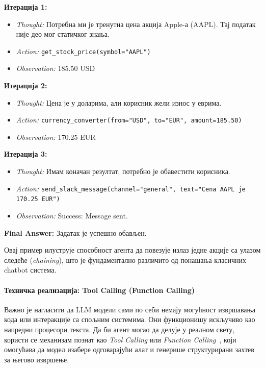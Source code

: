 \begin{tcolorbox}[colback=white,colframe=black,title=Унутрашњи процес агента]
\textbf{Итерација 1:}
\begin{itemize}
    \item \textit{Thought:} Потребна ми је тренутна цена акција Apple-а (AAPL).
    Тај податак није део мог статичког знања.
    \item \textit{Action:} \texttt{get\_stock\_price(symbol="AAPL")}
    \item \textit{Observation:} 185.50 USD
\end{itemize}

\textbf{Итерација 2:}
\begin{itemize}
    \item \textit{Thought:} Цена је у доларима, али корисник жели износ у еврима.
    \item \textit{Action:} \texttt{currency\_converter(from="USD", to="EUR", amount=185.50)}
    \item \textit{Observation:} 170.25 EUR
\end{itemize}

\textbf{Итерација 3:}
\begin{itemize}
    \item \textit{Thought:} Имам коначан резултат, потребно је обавестити корисника.
    \item \textit{Action:} \texttt{send\_slack\_message(channel="general", text="Cena AAPL je 170.25 EUR")}
    \item \textit{Observation:} Success: Message sent.
\end{itemize}

\textbf{Final Answer:} Задатак је успешно обављен.
\end{tcolorbox}
\noindent
Овај пример илуструје способност агента да повезује излаз једне акције
са улазом следеће (\textit{chaining}),
што је фундаментално различито од понашања класичних chatbot система.

\paragraph*{Техничка реализација: Tool Calling (Function Calling)}

Важно је нагласити да LLM модели сами по себи немају могућност извршавања кода
или интеракције са спољним системима.
Они функционишу искључиво као напредни процесори текста.
Да би агент могао да делује у реалном свету,
користи се механизам познат као \textit{Tool Calling} или \textit{Function Calling}~\cite{schick2023toolformer},
који омогућава да модел изабере одговарајући алат
и генерише структурирани захтев за његово извршење.

